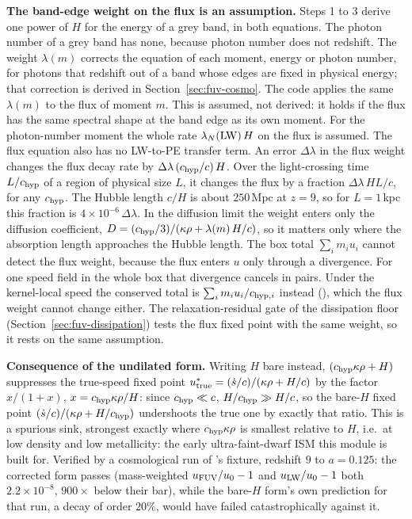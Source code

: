 \textbf{The band-edge weight on the flux is an assumption.} Steps 1 to 3
derive one power of $H$ for the energy of a grey band, in both equations.
The photon number of a grey band has none, because photon number does not
redshift. The weight
$\lambda(m)$ corrects the equation of each moment, energy or photon
number, for photons that redshift out of a band whose edges are fixed in
physical energy; that correction is
derived in Section~\ref{sec:fuv-cosmo}. The code applies the same
$\lambda(m)$ to the flux of moment $m$. This is assumed, not derived: it
holds if the flux has the same spectral shape at the band edge as its own
moment. For the photon-number moment the whole rate
$\lambda_N({\rm LW})\,H$ on the flux is assumed. The flux equation also has
no LW-to-PE transfer term. An error
$\Delta\lambda$ in the flux weight changes the flux decay rate by
$\Delta\lambda\,(c_{\rm hyp}/c)\,H$. Over the light-crossing time
$L/c_{\rm hyp}$ of a region of physical size $L$, it changes the flux by a fraction
$\Delta\lambda\,HL/c$, for any $c_{\rm hyp}$. The Hubble length $c/H$ is
about $250$\,Mpc at $z=9$, so for $L=1$\,kpc this fraction is
$4\times10^{-6}\,\Delta\lambda$. In the diffusion limit the weight enters
only the diffusion coefficient, $D = (c_{\rm hyp}/3)/(\kappa\rho +
\lambda(m)\,H/c)$, so it matters only where the absorption length approaches
the Hubble length. The box total $\sum_i m_i u_i$ cannot detect the flux
weight, because the flux enters $u$ only through a divergence. For one
speed field in the whole box that divergence cancels in pairs. Under the kernel-local speed the conserved total is $\sum_i m_i u_i/c_{{\rm hyp},i}$ instead (), which the flux weight cannot change either. The relaxation-residual gate of the dissipation floor
(Section~\ref{sec:fuv-dissipation}) tests the flux fixed point with the
same weight, so it rests on the same assumption.

\textbf{Consequence of the undilated form.} Writing $H$ bare instead,
$(c_{\rm hyp}\kappa\rho + H)$ suppresses the true-speed fixed
point $u^\ast_{\rm true} = (\dot s/c)/(\kappa\rho + H/c)$ by the factor
$x/(1+x)$, $x = c_{\rm hyp}\kappa\rho/H$: since $c_{\rm hyp}\ll c$,
$H/c_{\rm hyp} \gg H/c$, so the bare-$H$ fixed point
$(\dot s/c)/(\kappa\rho + H/c_{\rm hyp})$ undershoots the true one by
exactly that ratio. This is a spurious sink, strongest exactly where
$c_{\rm hyp}\kappa\rho$ is smallest relative to $H$, i.e.\ at low density
and low metallicity: the early ultra-faint-dwarf ISM this module is
built for. Verified by a cosmological run of 's
 fixture, redshift $9$ to $a=0.125$: the corrected form
passes (mass-weighted $u_{\rm FUV}/u_0-1$ and $u_{\rm LW}/u_0-1$ both
$2.2\times10^{-8}$, $900\times$ below their bar), while the bare-$H$
form's own prediction for that run, a decay of order $20\%$, would have
failed catastrophically against it.

